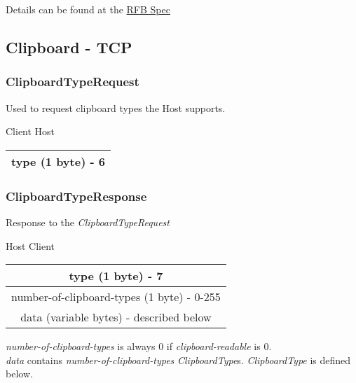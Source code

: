 \documentclass{article}
\begin{document}
    Details can be found at the \href{https://github.com/rfbproto/rfbproto/blob/master/rfbproto.rst#keyevent}{RFB Spec}

    \subsection{Clipboard - TCP} %

    \subsubsection{ClipboardTypeRequest}

    Used to request clipboard types the Host supports.

    \begin{center}
        Client \textrightarrow Host\\
        \begin{tabular}{|c|}
            \hline
            type (1 byte) - 6 \\
            \hline
        \end{tabular}
    \end{center}

    \subsubsection{ClipboardTypeResponse}

    Response to the \emph{ClipboardTypeRequest}

    \begin{center}
        Host \textrightarrow Client\\
        \begin{tabular}{|c|}
            \hline
            type (1 byte) - 7                          \\
            \hline
            number-of-clipboard-types (1 byte) - 0-255 \\
            \hline
            data (variable bytes) - described below    \\
            \hline
        \end{tabular}
    \end{center}

    \emph{number-of-clipboard-types} is always 0 if \emph{clipboard-readable} is 0.\\

    \emph{data} contains \emph{number-of-clipboard-types} \emph{ClipboardType}s. \emph{ClipboardType} is defined below.
\end{document}
